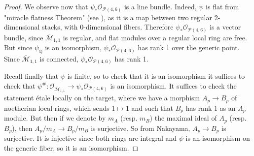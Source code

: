 \documentclass[11pt]{amsart}
\theoremstyle{definition}
\theoremstyle{remark}
\newcommand{\bQ}{{\mathbb Q}}
\newcommand{\calO}{\mathcal O}
\newcommand{\calM}{\mathcal M}
\newcommand{\calP}{\mathcal P}
\begin{document}
\begin{proof}
We observe now that $\psi_*\calO_{\calP(4,6)}$ is a line bundle. Indeed, $\psi$ is flat from "miracle flatness Theorem" (see  \cite[\href{https://stacks.math.columbia.edu/tag/00R3}{Tag 00R3}]{stacks-project}), as it is a map between two regular 2-dimensional stacks, with 0-dimensional fibers. Therefore $\psi_*\calO_{\calP(4,6)}$ is a vector bundle, since $\overline{\calM}_{1,1}$ is regular, and flat modules over a regular local ring are free. But since $\psi_\bQ$ is an isomorphism, $\psi_*\calO_{\calP(4,6)}$ has rank 1 over the generic point. Since $\overline{\calM}_{1,1}$ is connected, $\psi_*\calO_{\calP(4,6)}$ has rank 1.

Recall finally that $\psi$ is finite, so to check that it is an isomorphism it suffices to check that
$\psi^{\#} :\calO_{\overline{\calM}_{1,1}} \to \psi_*\calO_{\calP(4,6)}$ is an isomorphism. It suffices to check the statement \'etale locally on the target, where we have a morphism $A_p\to B_p$ of noetherian local rings, which sends $1\mapsto 1$ and such that $B_p$ has rank 1 as an $A_p$-module. But then if we denote by $m_A$ (resp. $m_B$) the maximal ideal of $A_p$ (resp. $B_p$), then $A_p/m_A\to B_p/m_B$ is surjective. So from Nakayama, $A_p \to B_p$ is surjective. It is injective since both rings are integral and $\psi$ is an isomorphism on the generic fiber, so it is an isomorphism.\end{proof}
\end{document}
